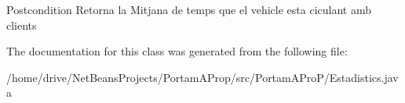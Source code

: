 \begin{DoxyPostcond}{Postcondition}
Retorna la Mitjana de temps que el vehicle esta ciculant amb clients 
\end{DoxyPostcond}


The documentation for this class was generated from the following file\+:\begin{DoxyCompactItemize}
\item 
/home/drive/\+Net\+Beans\+Projects/\+Portam\+A\+Prop/src/\+Portam\+A\+Pro\+P/Estadistics.\+java\end{DoxyCompactItemize}
